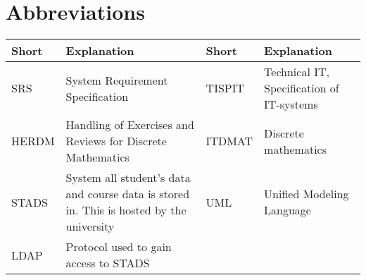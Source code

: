 \documentclass[Main]{subfiles}
\begin{document}
\section*{Abbreviations}

\begin{table}[H]

	\begin{tabular}{p{} p{} | p{} p{} }

	\hline
	Short & Explanation & Short & Explanation	\\\hline

	SRS & System Requirement Specification & 
	TISPIT & Technical IT, Specification of IT-systems
	\\
	
	HERDM & Handling of Exercises and Reviews for Discrete Mathematics &
	ITDMAT & Discrete mathematics
	\\
	
	STADS & System all student's data and course data is stored in. This is hosted by the university &
	UML & Unified Modeling Language
	\\
	
	LDAP & Protocol used to gain access to STADS
	
	


	\\\hline
	\end{tabular}

\label{Tab:Abbreviations}
\end{table}
\end{document}
